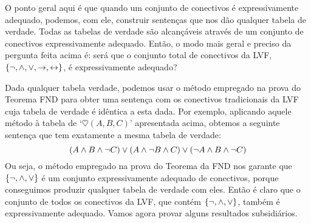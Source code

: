O ponto geral aqui é que quando um conjunto de conectivos é expressivamente adequado, podemos, com ele, construir sentenças que nos dão qualquer tabela de verdade.
Todas as tabelas de verdade são alcançáveis através de um conjunto de conectivos expressivamente adequado.
Então, o modo mais geral e preciso da pergunta feita acima é: será que o conjunto total de conectivos da LVF, $\{\neg, \wedge, \vee, \rightarrow, \leftrightarrow\}$, é expressivamente adequado?

Dada qualquer tabela verdade, podemos usar o método empregado na prova do Teorema FND para obter uma sentença com os conectivos tradicionais da LVF cuja tabela de verdade é idêntica a esta dada.
Por exemplo, aplicando aquele método à tabela de `$\heartsuit(A, B, C)$' apresentada acima,  obtemos a seguinte sentença que tem exatamente a mesma tabela de verdade:
		$$(A \wedge B \wedge \neg C) \vee (A \wedge \neg B \wedge C) \vee (\neg A \wedge B \wedge \neg C)$$			
Ou seja, o método empregado na prova do Teorema da FND nos garante que $\{\neg, \wedge, \vee \}$ é um conjunto expressivamente adequado de conectivos, porque conseguimos produzir qualquer tabela de verdade com eles.
Então é claro que o conjunto de todos os conectivos da LVF, que contém $\{\neg, \wedge, \vee \}$, também é expressivamente adequado.
Vamos agora provar alguns resultados subsidiários.

